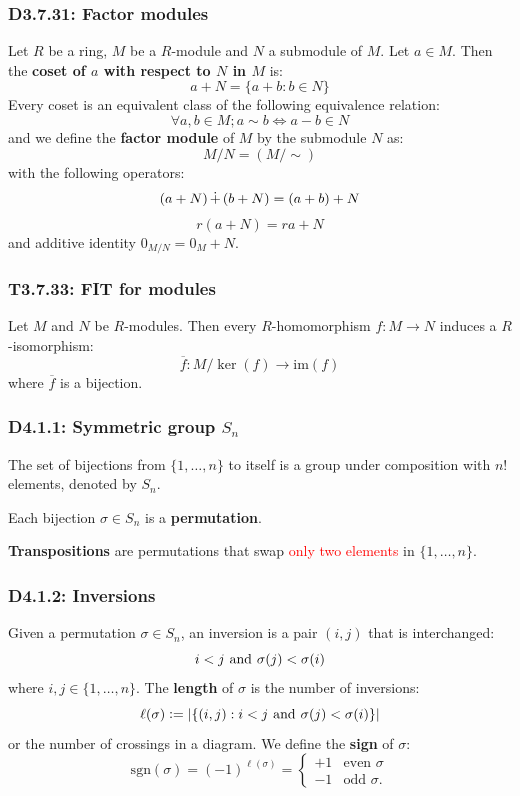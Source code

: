 \documentclass{article}
\newcommand{\deq}{\vcentcolon=}
\begin{document}
\begin{multicols*}{3}
\subsubsection*{D3.7.31: Factor modules}
Let $R$ be a ring, $M$ be a $R$-module 
and $N$ a submodule of $M$. Let $a\in M$. Then the
\textbf{coset of $a$ with respect to $N$ in $M$} is:
$$a+N=\{a+b:b\in N\}$$
Every coset is an equivalent class of the following
equivalence relation:
$$\forall a,b\in M;a\sim b\iff 
a-b\in N$$
and we define the \textbf{factor module} of $M$
by the submodule $N$ as:
$$M/N=(M/\sim)$$
with the following operators:
$$(a+N)\hspace{0.02in}\dot{+}\hspace{0.02in}
(b+N)=(a+b)+N$$
$$r(a+N)=ra+N$$
and additive identity $0_{M/N}=0_M+N$.

\subsubsection*{T3.7.33: FIT for modules}
Let $M$ and $N$ be $R$-modules. Then every
$R$-homomorphism $f:M\rightarrow N$ induces
a $R$-isomorphism:
$$\overline{f}:M/\ker(f)\rightarrow\text{im}(f)$$
where $\overline{f}$ is a bijection.

\subsubsection*{D4.1.1: Symmetric group $S_n$}
The set of bijections from $\{1,\dots,n\}$ to itself
is a group under composition with $n!$ elements, denoted
by $S_n$.

Each bijection $\sigma\in S_n$ is a \textbf{permutation}.

\textbf{Transpositions} are permutations that swap
\textcolor{red}{only two elements} in $\{1,\dots, n\}$.

\subsubsection*{D4.1.2: Inversions}
Given a permutation $\sigma\in S_n$, an inversion is
a pair $(i,j)$ that is interchanged:
$$i<j\hspace{0.05in}\text{and}
\hspace{0.05in}\sigma(j)<\sigma(i)$$
where $i,j\in\{1,\dots, n\}$. The \textbf{length} of
$\sigma$ is the number of inversions:
$$\ell(\sigma)\deq|\{(i,j):i<j\hspace{0.05in}\text{and}
\hspace{0.05in}\sigma(j)<\sigma(i)\}|$$
or the number of crossings in a diagram.
We define the \textbf{sign} of $\sigma$:
$$\text{sgn}(\sigma)=(-1)^{\ell(\sigma)}
=\left\{\begin{array}{ll} +1 & \text{even $\sigma$} \\
-1 & \text{odd $\sigma$.}\end{array}\right.$$


\end{multicols*}
\end{document}
